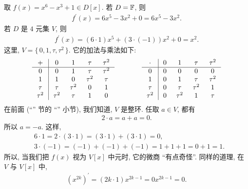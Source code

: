\begin{example}
    取 $f(x) = x^6 - x^3 + 1 \in D[x]$. 若 $D = \mathbb{F}$, 则
    \begin{align*}
        f^{\prime}(x) = 6x^5 - 3x^2 + 0 = 6x^5 - 3x^2.
    \end{align*}
    若 $D$ 是 $4$ 元集 $V$, 则
    \begin{align*}
        f^{\prime}(x) = (6 \cdot 1)x^5 + (3 \cdot (-1)) x^2 + 0 = x^2.
    \end{align*}
    这里, $V = \{\, 0,1,\tau,\tau^2 \,\}$. 它的加法与乘法如下:
    \begin{align*}
        \arraycolsep=0.25cm
        \begin{array}{c|cccc}
            +      & 0      & 1      & \tau   & \tau^2 \\ \hline
            0      & 0      & 1      & \tau   & \tau^2 \\
            1      & 1      & 0      & \tau^2 & \tau   \\
            \tau   & \tau   & \tau^2 & 0      & 1      \\
            \tau^2 & \tau^2 & \tau   & 1      & 0      \\
        \end{array}
        \qquad \qquad
        \begin{array}{c|cccc}
            \cdot  & 0 & 1      & \tau   & \tau^2 \\ \hline
            0      & 0 & 0      & 0      & 0      \\
            1      & 0 & 1      & \tau   & \tau^2 \\
            \tau   & 0 & \tau   & \tau^2 & 1      \\
            \tau^2 & 0 & \tau^2 & 1      & \tau   \\
        \end{array}
    \end{align*}
    在前面 (``\Prerequisites '' 节的 ``\Domains '' 小节), 我们知道, $V$ 是整环. 任取 $a \in V$, 都有
    \begin{align*}
        2 \cdot a = a + a = 0.
    \end{align*}
    所以 $a = -a$. 这样,
    \begin{align*}
         & 6 \cdot 1 = 2 \cdot (3 \cdot 1) = (3 \cdot 1) + (3 \cdot 1) = 0, \\
         & 3 \cdot (-1) = (-1) + (-1) + (-1) = 1 + 1 + 1 = 0 + 1 = 1.
    \end{align*}
    所以, 当我们把 $f(x)$ 视为 $V[x]$ 中元时, 它的微商 ``有点奇怪''. 同样的道理, 在 $V$ 与 $V[x]$ 中,
    \begin{align*}
        (x^{2k})^{\prime} = (2k \cdot 1) x^{2k-1} = 0 x^{2k-1} = 0.
    \end{align*}
\end{example}


